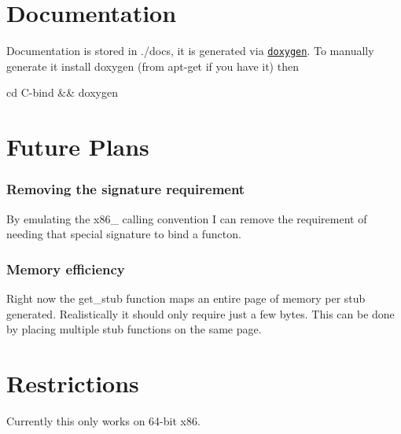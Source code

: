 \section*{Documentation}

Documentation is stored in {\ttfamily ./docs}, it is generated via \href{http://www.doxygen.nl/}{\tt doxygen}. To manually generate it install doxygen (from {\ttfamily apt-\/get} if you have it) then 
\begin{DoxyCode}
cd C-bind && doxygen
\end{DoxyCode}


\section*{Future Plans}

\subsubsection*{Removing the signature requirement}

By emulating the {\ttfamily x86\+\_} calling convention I can remove the requirement of needing that special signature to bind a functon.

\subsubsection*{Memory efficiency}

Right now the {\ttfamily get\+\_\+stub} function maps an entire page of memory per stub generated. Realistically it should only require just a few bytes. This can be done by placing multiple stub functions on the same page.

\section*{Restrictions}

Currently this only works on 64-\/bit {\ttfamily x86}. 